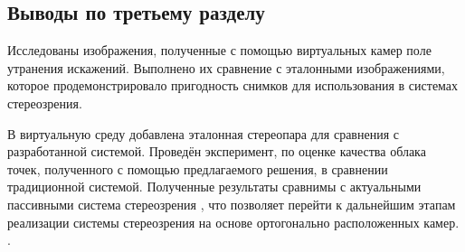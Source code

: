 \subsection{Выводы по третьему разделу}

Исследованы изображения, полученные с помощью виртуальных камер поле утранения искажений. Выполнено их сравнение 
с эталонными изображениями,  которое продемонстрировало пригодность снимков для использования в системах стереозрения.

В виртуальную среду добавлена эталонная стереопара для сравнения с разработанной системой. Проведён эксперимент,
по оценке качества облака точек, полученного с помощью предлагаемого решения, в сравнении  традиционной системой.
Полученные результаты сравнимы с актуальными пассивными система стереозрения \cite{passive_perf}, что позволяет перейти
к дальнейшим этапам реализации системы стереозрения на основе ортогонально расположенных камер. . 


